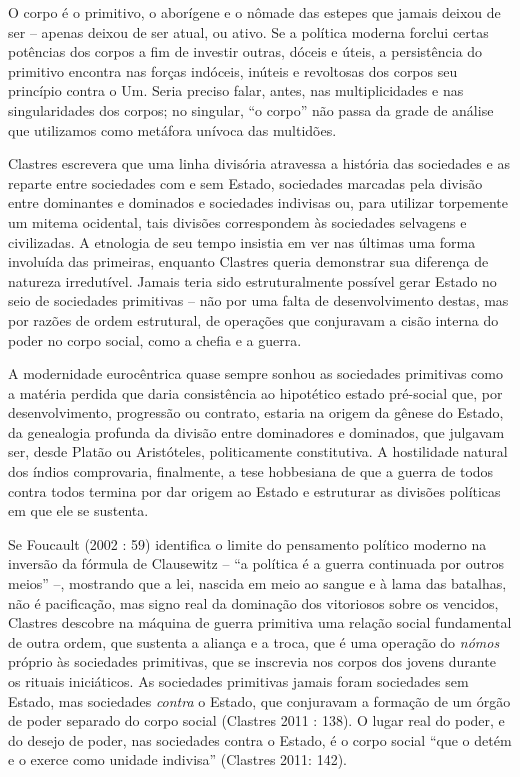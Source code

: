 O corpo é o primitivo, o aborígene e o nômade das estepes que jamais
deixou de ser -- apenas deixou de ser atual, ou ativo. Se a política
moderna forclui certas potências dos corpos a fim de investir outras,
dóceis e úteis, a persistência do primitivo encontra nas forças
indóceis, inúteis e revoltosas dos corpos seu princípio contra o Um.
Seria preciso falar, antes, nas multiplicidades e nas singularidades dos
corpos; no singular, ``o corpo'' não passa da grade de análise que
utilizamos como metáfora unívoca das multidões.

Clastres escrevera que uma linha divisória atravessa a história das
sociedades e as reparte entre sociedades com e sem Estado, sociedades
marcadas pela divisão entre dominantes e dominados e sociedades
indivisas ou, para utilizar torpemente um mitema ocidental, tais
divisões correspondem às sociedades selvagens e civilizadas. A etnologia
de seu tempo insistia em ver nas últimas uma forma involuída das
primeiras, enquanto Clastres queria demonstrar sua diferença de natureza
irredutível. Jamais teria sido estruturalmente possível gerar Estado no
seio de sociedades primitivas -- não por uma falta de desenvolvimento
destas, mas por razões de ordem estrutural, de operações que conjuravam
a cisão interna do poder no corpo social, como a chefia e a guerra.

A modernidade eurocêntrica quase sempre sonhou as sociedades primitivas
como a matéria perdida que daria consistência ao hipotético estado
pré-social que, por desenvolvimento, progressão ou contrato, estaria na
origem da gênese do Estado, da genealogia profunda da divisão entre
dominadores e dominados, que julgavam ser, desde Platão ou Aristóteles,
politicamente constitutiva. A hostilidade natural dos índios
comprovaria, finalmente, a tese hobbesiana de que a guerra de todos
contra todos termina por dar origem ao Estado e estruturar as divisões
políticas em que ele se sustenta.

Se Foucault (2002 : 59) identifica o limite do pensamento político
moderno na inversão da fórmula de Clausewitz -- ``a política é a guerra
continuada por outros meios'' --, mostrando que a lei, nascida em meio
ao sangue e à lama das batalhas, não é pacificação, mas signo real da
dominação dos vitoriosos sobre os vencidos, Clastres descobre na máquina
de guerra primitiva uma relação social fundamental de outra ordem, que
sustenta a aliança e a troca, que é uma operação do \emph{nómos }próprio
às sociedades primitivas, que se inscrevia nos corpos dos jovens durante
os rituais iniciáticos. As sociedades primitivas jamais foram sociedades
sem Estado, mas sociedades \emph{contra }o Estado, que conjuravam a
formação de um órgão de poder separado do corpo social (Clastres 2011 :
138). O lugar real do poder, e do desejo de poder, nas sociedades contra
o Estado, é o corpo social ``que o detém e o exerce como unidade
indivisa'' (Clastres 2011: 142).

